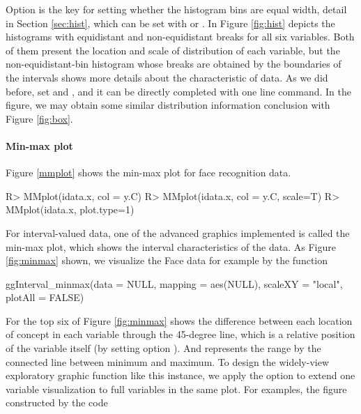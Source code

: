 \documentclass[article]{jss}
\begin{document}
Option  is the key for setting whether the histogram bins are equal width, detail in Section \ref{sec:hist}, which can be set with  or . In Figure \ref{fig:hist} depicts the histograms with equidistant and non-equidistant breaks for all six variables. Both of them present the location and scale of distribution of each variable, but the non-equidistant-bin histogram whose breaks are obtained by the boundaries of the intervals shows more details about the characteristic of data. As we did before, set  and , and it can be directly completed with one line command. In the figure, we may obtain some similar distribution information conclusion with Figure \ref{fig:box}.


\paragraph{Min-max plot}
Figure \ref{mmplot} shows the min-max plot for face recognition data.
\begin{CodeChunk}
\begin{CodeInput}
R> MMplot(idata.x, col = y.C)
R> MMplot(idata.x, col = y.C, scale=T)
R> MMplot(idata.x, plot.type=1)
\end{CodeInput}
\end{CodeChunk}

For interval-valued data, one of the advanced graphics implemented is called the min-max plot, which shows the interval characteristics of the data. As Figure \ref{fig:minmax} shown, we visualize the Face data for example by the function 



\begin{CodeChunk}
\begin{CodeInput}
ggInterval_minmax(data = NULL, mapping = aes(NULL), scaleXY = "local",
  plotAll = FALSE)
\end{CodeInput}
\end{CodeChunk}


For the top six of Figure \ref{fig:minmax} shows the difference between each location of concept in each variable through the 45-degree line, which is a relative position of the variable itself (by setting option ). And represents the range by the connected line between minimum and maximum. To design the widely-view exploratory graphic function like this instance, we apply the option  to extend one variable visualization to full variables in the same plot. For examples, the figure constructed by the code
\end{document}
